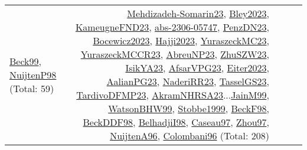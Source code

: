 {\begin{longtable}{p{3cm}r>{\raggedright\arraybackslash}p{6cm}>{\raggedright\arraybackslash}p{6cm}>{\raggedright\arraybackslash}p{8cm}}
\hyperref[detail:Beck99]{Beck99}, \hyperref[detail:NuijtenP98]{NuijtenP98} (Total: 59) & \hyperref[detail:Mehdizadeh-Somarin23]{Mehdizadeh-Somarin23}, \hyperref[detail:Bley2023]{Bley2023}, \hyperref[detail:KameugneFND23]{KameugneFND23}, \hyperref[detail:abs-2306-05747]{abs-2306-05747}, \hyperref[detail:PenzDN23]{PenzDN23}, \hyperref[detail:Bocewicz2023]{Bocewicz2023}, \hyperref[detail:Hajji2023]{Hajji2023}, \hyperref[detail:YuraszeckMC23]{YuraszeckMC23}, \hyperref[detail:YuraszeckMCCR23]{YuraszeckMCCR23}, \hyperref[detail:AbreuNP23]{AbreuNP23}, \hyperref[detail:ZhuSZW23]{ZhuSZW23}, \hyperref[detail:IsikYA23]{IsikYA23}, \hyperref[detail:AfsarVPG23]{AfsarVPG23}, \hyperref[detail:Eiter2023]{Eiter2023}, \hyperref[detail:AalianPG23]{AalianPG23}, \hyperref[detail:NaderiRR23]{NaderiRR23}, \hyperref[detail:TasselGS23]{TasselGS23}, \hyperref[detail:TardivoDFMP23]{TardivoDFMP23}, \hyperref[detail:AkramNHRSA23]{AkramNHRSA23}...\hyperref[detail:JainM99]{JainM99}, \hyperref[detail:WatsonBHW99]{WatsonBHW99}, \hyperref[detail:Stobbe1999]{Stobbe1999}, \hyperref[detail:BeckF98]{BeckF98}, \hyperref[detail:BeckDDF98]{BeckDDF98}, \hyperref[detail:BelhadjiI98]{BelhadjiI98}, \hyperref[detail:Caseau97]{Caseau97}, \hyperref[detail:Zhou97]{Zhou97}, \hyperref[detail:NuijtenA96]{NuijtenA96}, \hyperref[detail:Colombani96]{Colombani96} (Total: 208)\\

\end{longtable}}
